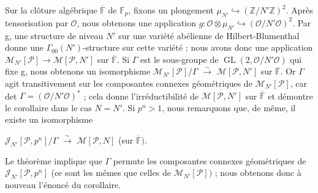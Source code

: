 \documentclass[11pt]{article}
\begin{document}
Sur la clôture algébrique \(\overline{\mathbb{F}}\) de \(\mathbb{F}_{p}\), fixons un plongement \(\mu _{N'}\hookrightarrow (\mathbb{Z}/N'\mathbb{Z})^{2}\). Après tensorisation par \(\mathcal{O}\), nous obtenons une application \(g:\mathcal{O}\otimes \mu _{N'}\hookrightarrow (\mathcal{O}/N'\mathcal{O})^{2}\). Par g, une structure de niveau \(N'\) sur une variété abélienne de Hilbert-Blumenthal donne une \(\Gamma _{00}(N')\)-structure sur cette variété ; nous avons donc une application \(\mathcal{M}_{N'}[\mathcal{P}]\to \mathcal{M}[\mathcal{P},N']\) sur \(\overline{\mathbb{F}}\). Si \(\Gamma \) est le sous-groupe de \(\operatorname{GL}(2,\mathcal{O}/N'\mathcal{O})\) qui fixe g, nous obtenons un isomorphisme \(\mathcal{M}_{N'}[\mathcal{P}]/\Gamma \) \(\xrightarrow{\sim}\) \(\mathcal{M}[\mathcal{P},N']\) sur \(\overline{\mathbb{F}}\). Or \(\Gamma \) agit transitivement sur les composantes connexes géométriques de \(\mathcal{M}_{N'}[\mathcal{P}]\), car det \(\Gamma =(\mathcal{O}/N'\mathcal{O})^{\ast}\) ; cela donne l’irréductibilité de \(\mathcal{M}[\mathcal{P},N']\) sur \(\overline{\mathbb{F}}\) et démontre le corollaire dans le cas \(N=N'\). Si \(p^{n}>1\), nous remarquons que, de même, il existe un isomorphisme\par
\par
\(\mathcal{J}_{N'}[\mathcal{P},p^{n}]/\Gamma \) \(\xrightarrow{\sim}\) \(\mathcal{M}[\mathcal{P},N]\)    (sur \(\overline{\mathbb{F}})\).\par
\par
Le théorème implique que \(\Gamma \) permute les composantes connexes géométriques de \(\mathcal{J}_{N'}[\mathcal{P},p^{n}]\) (ce sont les mêmes que celles de \(\mathcal{M}_{N'}[\mathcal{P}])\) ; nous obtenons donc à nouveau l’énoncé du corollaire.\par
\par
\end{document}
